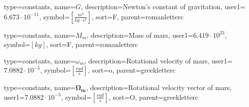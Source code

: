 {
type=constants, %
name={\ensuremath{G}}, %
description={Newton's constant of gravitation}, %
user1={$6.673\cdot10^{-11}$}, %
symbol={$\left[\frac{m^3}{kg \cdot s^{2}}\right]$}, %
sort=F, %
parent=romanletterc %
}

{
type=constants, %
name={\ensuremath{M_{m}}}, %
description={Mass of mars}, %
user1={$6.419\cdot10^{23}$}, %
symbol={$\left[kg\right]$}, %
sort=F, %
parent=romanletterc %
}

{
type=constants, %
name={\ensuremath{\omega_{m}}}, %
description={Rotational velocity of mars}, %
user1={$7.0882\cdot10^{-5}$}, %
symbol={$\left[\frac{rad}{s}\right]$}, %
sort=o, %
parent=greekletterc %
}

{
type=constants, %
name={\ensuremath{\mathbf{\Omega_{m}}}}, %
description={Rotational velocity vector of mars}, %
user1={$7.0882\cdot10^{-5}$}, %
symbol={$\left[\frac{rad}{s}\right]$}, %
sort=O, %
parent=greekletterc %
}